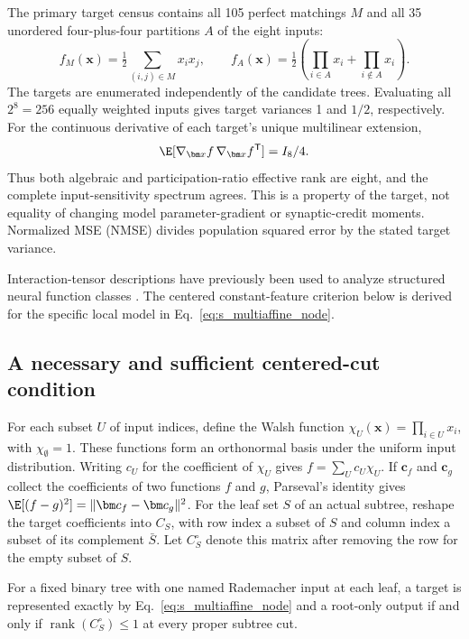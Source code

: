 The primary target census contains all 105 perfect matchings $M$ and all
35 unordered four-plus-four partitions $A$ of the eight inputs:
\begin{equation}
 f_M(\bm x)=\tfrac12\sum_{(i,j)\in M}x_ix_j,
 \qquad
 f_A(\bm x)=\tfrac12\left(\prod_{i\in A}x_i+
                              \prod_{i\notin A}x_i\right).
 \label{eq:s_interaction_targets}
\end{equation}
The targets are enumerated independently of the candidate trees. Evaluating
all $2^8=256$ equally weighted inputs gives target variances 1 and $1/2$,
respectively. For the continuous derivative of each target's unique
multilinear extension,
\begin{equation}
 \E[\nabla_{\bm x}f\,\nabla_{\bm x}f^{\mathsf T}]=I_8/4.
 \label{eq:s_equal_input_sensitivity}
\end{equation}
Thus both algebraic and participation-ratio effective rank are eight, and
the complete input-sensitivity spectrum agrees. This is a property of the
target, not equality of changing model parameter-gradient or synaptic-credit
moments. Normalized MSE (NMSE) divides population squared error by the stated
target variance.

Interaction-tensor descriptions have previously been used to analyze
structured neural function classes \citep{cohen2016tensor}. The centered
constant-feature criterion below is derived for the specific local model in
Eq.~\ref{eq:s_multiaffine_node}.

\subsection{A necessary and sufficient centered-cut condition}
\label{note:centered_cut_theorem}

For each subset $U$ of input indices, define the Walsh function
$\chi_U(\bm x)=\prod_{i\in U}x_i$, with $\chi_\emptyset=1$. These
functions form an orthonormal basis under the uniform input distribution.
Writing $c_U$ for the coefficient of $\chi_U$ gives
$f=\sum_U c_U\chi_U$. If $\bm c_f$ and $\bm c_g$ collect the
coefficients of two functions $f$ and $g$, Parseval's identity gives
$\E[(f-g)^2]=\|\bm c_f-\bm c_g\|^2$. For the leaf set $S$ of an actual
subtree, reshape the target coefficients into $C_S$, with row index a subset
of $S$ and column index a subset of its complement $\bar S$. Let $C_S^\circ$ denote
this matrix after removing the row for the empty subset of $S$.

\begin{proposition}
\label{prop:s_centered_tree_iff}
For a fixed binary tree with one named Rademacher input at each leaf, a target
is represented exactly by Eq.~\ref{eq:s_multiaffine_node} and a root-only
output if and only if $\operatorname{rank}(C_S^\circ)\leq1$ at every proper
subtree cut.
\end{proposition}

